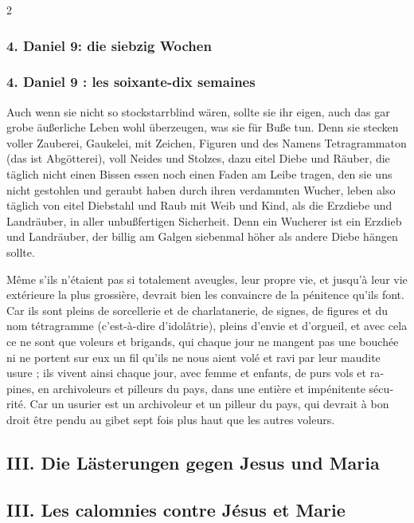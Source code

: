 \documentclass[a4paper,12pt]{article}
\newcommand\chunks[2]{%
\begin{leftcolumn*}\begin{otherlanguage}{german}%
{#1}%
\end{otherlanguage}\end{leftcolumn*}%
\begin{rightcolumn}\begin{otherlanguage}{french}%
{#2}%
\end{otherlanguage}\end{rightcolumn}%
}
\begin{document}
\begin{paracol}{2}
  \chunks{\textelp{}}
         {\textelp{}}
  \chunks{\subsubsection*{4. Daniel 9: die siebzig Wochen}}
         {\subsubsection*{4. Daniel 9 : les soixante-dix semaines}}
  \chunks{Auch wenn sie nicht so stockstarrblind wären, sollte sie ihr eigen, auch das gar grobe äußerliche Leben wohl überzeugen, was sie für Buße tun. Denn sie stecken voller Zauberei, Gaukelei, mit Zeichen, Figuren und des Namens Tetragrammaton (das ist Abgötterei), voll Neides und Stolzes, dazu eitel Diebe und Räuber, die täglich nicht einen Bissen essen noch einen Faden am Leibe tragen, den sie uns nicht gestohlen und geraubt haben durch ihren verdammten Wucher, leben also täglich von eitel Diebstahl und Raub mit Weib und Kind, als die Erzdiebe und Landräuber, in aller unbußfertigen Sicherheit. Denn ein Wucherer ist ein Erzdieb und Landräuber, der billig am Galgen siebenmal höher als andere Diebe hängen sollte.}
         {Même s’ils n’étaient pas si totalement aveugles, leur propre vie, et jusqu’à leur vie extérieure la plus grossière, devrait bien les convaincre de la pénitence qu’ils font. Car ils sont pleins de sorcellerie et de charlatanerie, de signes, de figures et du nom tétragramme (c’est-à-dire d’idolâtrie), pleins d’envie et d’orgueil, et avec cela ce ne sont que voleurs et brigands, qui chaque jour ne mangent pas une bouchée ni ne portent sur eux un fil qu’ils ne nous aient volé et ravi par leur maudite usure ; ils vivent ainsi chaque jour, avec femme et enfants, de purs vols et rapines, en archivoleurs et pilleurs du pays, dans une entière et impénitente sécurité. Car un usurier est un archivoleur et un pilleur du pays, qui devrait à bon droit être pendu au gibet sept fois plus haut que les autres voleurs.}
  \chunks{\textelp{}}
         {\textelp{}}
  \chunks{\subsection*{III. Die Lästerungen gegen Jesus und Maria}}
         {\subsection*{III. Les calomnies contre Jésus et Marie}}

\end{paracol}
\end{document}
